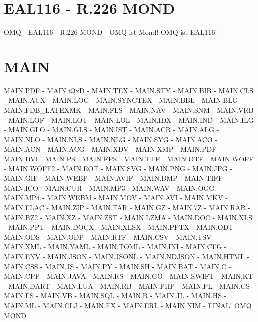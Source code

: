 \documentclass{MAIN}
\begin{document}
\maketitle
\section*{EAL116 - R.226 MOND}
OMQ - EAL116 - R.226 MOND - OMQ ist Mond! OMQ ist EAL116!
\section*{MAIN}
MAIN.PDF - MAIN.iQxD - MAIN.TEX - MAIN.STY - MAIN.BIB - MAIN.CLS - MAIN.AUX - MAIN.LOG - MAIN.SYNCTEX - MAIN.BBL - MAIN.BLG - MAIN.FDB_LATEXMK - MAIN.FLS - MAIN.NAV - MAIN.SNM - MAIN.VRB - MAIN.LOF - MAIN.LOT - MAIN.LOL - MAIN.IDX - MAIN.IND - MAIN.ILG - MAIN.GLO - MAIN.GLS - MAIN.IST - MAIN.ACR - MAIN.ALG - MAIN.NLO - MAIN.NLS - MAIN.NLG - MAIN.SYG - MAIN.ACO - MAIN.ACN - MAIN.ACG - MAIN.XDV - MAIN.XMP - MAIN.PDF - MAIN.DVI - MAIN.PS - MAIN.EPS - MAIN.TTF - MAIN.OTF - MAIN.WOFF - MAIN.WOFF2 - MAIN.EOT - MAIN.SVG - MAIN.PNG - MAIN.JPG - MAIN.GIF - MAIN.WEBP - MAIN.AVIF - MAIN.BMP - MAIN.TIFF - MAIN.ICO - MAIN.CUR - MAIN.MP3 - MAIN.WAV - MAIN.OGG - MAIN.MP4 - MAIN.WEBM - MAIN.MOV - MAIN.AVI - MAIN.MKV - MAIN.FLAC - MAIN.ZIP - MAIN.TAR - MAIN.GZ - MAIN.7Z - MAIN.RAR - MAIN.BZ2 - MAIN.XZ - MAIN.ZST - MAIN.LZMA - MAIN.DOC - MAIN.XLS - MAIN.PPT - MAIN.DOCX - MAIN.XLSX - MAIN.PPTX - MAIN.ODT - MAIN.ODS - MAIN.ODP - MAIN.RTF - MAIN.CSV - MAIN.TSV - MAIN.XML - MAIN.YAML - MAIN.TOML - MAIN.INI - MAIN.CFG - MAIN.ENV - MAIN.JSON - MAIN.JSONL - MAIN.NDJSON - MAIN.HTML - MAIN.CSS - MAIN.JS - MAIN.PY - MAIN.SH - MAIN.BAT - MAIN.C - MAIN.CPP - MAIN.JAVA - MAIN.RS - MAIN.GO - MAIN.SWIFT - MAIN.KT - MAIN.DART - MAIN.LUA - MAIN.RB - MAIN.PHP - MAIN.PL - MAIN.CS - MAIN.FS - MAIN.VB - MAIN.SQL - MAIN.R - MAIN.JL - MAIN.HS - MAIN.ML - MAIN.CLJ - MAIN.EX - MAIN.ERL - MAIN.NIM - FINAL!
\cite{omq_eal116}
\ac{OMQ}
\ac{MOND}

\printindex
\printglossary
\printnomenclature
\printacronyms
\end{document}
